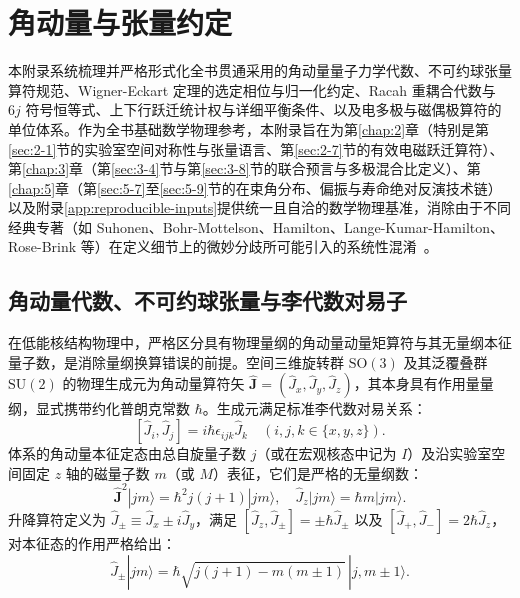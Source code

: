 \chapter{角动量与张量约定}\label{app:angular-momentum-tensors}

本附录系统梳理并严格形式化全书贯通采用的角动量量子力学代数、不可约球张量算符规范、Wigner-Eckart 定理的选定相位与归一化约定、Racah 重耦合代数与 $6j$ 符号恒等式、上下行跃迁统计权与详细平衡条件、以及电多极与磁偶极算符的单位体系。作为全书基础数学物理参考，本附录旨在为第\ref{chap:2}章（特别是第\ref{sec:2-1}节的实验室空间对称性与张量语言、第\ref{sec:2-7}节的有效电磁跃迁算符）、第\ref{chap:3}章（第\ref{sec:3-4}节与第\ref{sec:3-8}节的联合预言与多极混合比定义）、第\ref{chap:5}章（第\ref{sec:5-7}至\ref{sec:5-9}节的在束角分布、偏振与寿命绝对反演技术链）以及附录\ref{app:reproducible-inputs}提供统一且自洽的数学物理基准，消除由于不同经典专著（如 Suhonen、Bohr-Mottelson、Hamilton、Lange-Kumar-Hamilton、Rose-Brink 等）在定义细节上的微妙分歧所可能引入的系统性混淆~\cite{book-suhonen-from-nucleons-to-nucleus,book-bohr-mottelson-nuclear-structure,book-hamilton-electromagnetic-interaction,lange-kumar-hamilton-1982-multipole-admixtures}。

\section{角动量代数、不可约球张量与李代数对易子}\label{sec:appA-1}

在低能核结构物理中，严格区分具有物理量纲的角动量动量矩算符与其无量纲本征量子数，是消除量纲换算错误的前提。空间三维旋转群 $\mathrm{SO}(3)$ 及其泛覆叠群 $\mathrm{SU}(2)$ 的物理生成元为角动量算符矢 $\hat{\mathbf{J}} = (\hat{J}_x, \hat{J}_y, \hat{J}_z)$，其本身具有作用量量纲，显式携带约化普朗克常数 $\hbar$。生成元满足标准李代数对易关系：
\begin{equation}\label{eq:appA-lie-comm}
[\hat{J}_i, \hat{J}_j] = i \hbar \epsilon_{ijk} \hat{J}_k \quad (i, j, k \in \{x, y, z\}) .
\end{equation}
体系的角动量本征定态由总自旋量子数 $j$（或在宏观核态中记为 $I$）及沿实验室空间固定 $z$ 轴的磁量子数 $m$（或 $M$）表征，它们是严格的无量纲数：
\begin{equation}\label{eq:appA-j-eigen}
\hat{\mathbf{J}}^2 |j m\rangle = \hbar^2 j(j+1) |j m\rangle , \quad \hat{J}_z |j m\rangle = \hbar m |j m\rangle .
\end{equation}
升降算符定义为 $\hat{J}_\pm \equiv \hat{J}_x \pm i \hat{J}_y$，满足 $[\hat{J}_z, \hat{J}_\pm] = \pm \hbar \hat{J}_\pm$ 以及 $[\hat{J}_+, \hat{J}_-] = 2\hbar \hat{J}_z$，对本征态的作用严格给出：
\begin{equation}\label{eq:appA-ladder-action}
\hat{J}_\pm |j m\rangle = \hbar \sqrt{j(j+1) - m(m \pm 1)} \, |j, m \pm 1\rangle .
\end{equation}

